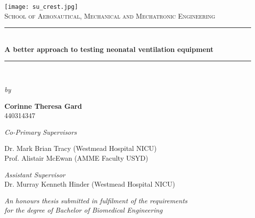\documentclass[12pt, openany, oneside]{book}
\begin{document}
{\selectfont

\begin{titlepage}
\newcommand{\HRule}{\rule{\linewidth}{0.1mm}} 
\center
\texttt{[image: su\_crest.jpg]}\\
\textsc{\large School of Aeronautical, Mechanical and Mechatronic Engineering}\\[0.5cm] 
\HRule \\[0.4cm]
\huge \bfseries A better approach to testing neonatal ventilation equipment\\ 
\HRule \\[1cm]

\begin{center}

\small\textit{by}

\vspace{1cm}
								
\large\textbf{Corinne Theresa Gard}\\
440314347

\vspace{1cm}

\small\textit{Co-Primary Supervisors}\\

\normalsize
	
Dr. Mark Brian Tracy (Westmead Hospital NICU) \\

Prof. Alistair McEwan (AMME Faculty USYD)  \\

\vspace{0.2cm}

\small\textit{Assistant Supervisor}\\

\normalsize
Dr. Murray Kenneth Hinder (Westmead Hospital NICU)\\
				

\vspace*{1cm}

\small \textit{An honours thesis submitted in fulfilment of the requirements \\ for the degree of Bachelor of Biomedical Engineering}\\[2cm]

\end{center}
\end{titlepage}

}
\end{document}
